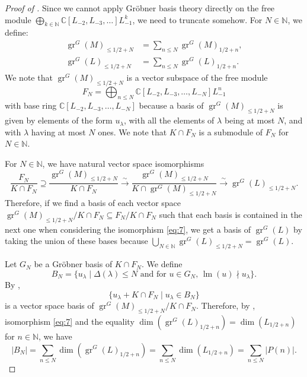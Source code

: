 \documentclass[a4paper, 12pt, reqno]{amsart}
\theoremstyle{remark}
\DeclareMathOperator{\gr}{gr}
\DeclareMathOperator{\lm}{lm}
\begin{document}
\begin{proof}[Proof of ]
  Since we cannot apply Gröbner basis theory directly on the free module $\bigoplus_{k \in \mathbb{N}}\mathbb{C}[L_{-2}, L_{-3}, \dots]L_{-1}^k$, we need to truncate somehow.
  For $N \in \mathbb{N}$, we define:
  \begin{align*}
    \gr^G(M)_{\le 1/2 + N} &= \sum_{n \le N}\gr^G(M)_{1/2 + n}, \\
    \gr^G(L)_{\le 1/2 + N} &= \sum_{n \le N}\gr^G(L)_{1/2 + n}.
  \end{align*}
  We note that $\gr^G(M)_{\le 1/2 + N}$ is a vector subspace of the free module
  \begin{equation*}
    F_N = \bigoplus_{n \le N}\mathbb{C}[L_{-2}, L_{-3}, \dots, L_{-N}]L_{-1}^n
  \end{equation*}
  with base ring $\mathbb{C}[L_{-2}, L_{-3}, \dots, L_{-N}]$ because a basis of $\gr^G(M)_{\le 1/2 + N}$ is given by elements of the form $u_{\lambda}$, with all the elements of $\lambda$ being at most $N$, and with $\lambda$ having at most $N$ ones.
  We note that $K \cap F_N$ is a submodule of $F_N$ for $N \in \mathbb{N}$.

  For $N \in \mathbb{N}$, we have natural vector space isomorphisms
  \begin{equation}
    \label{eq:7}
    \frac{F_N}{K \cap F_N} \supseteq \frac{\gr^G(M)_{\le 1/2 + N}}{K \cap F_N} \xrightarrow{\sim} \frac{\gr^G(M)_{\le 1/2 + N}}{K \cap \gr^G(M)_{\le 1/2 + N}} \xrightarrow{\sim} \gr^G(L)_{\le 1/2 + N}.
  \end{equation}
  Therefore, if we find a basis of each vector space $\gr^G(M)_{\le 1/2 + N}/K \cap F_N \subseteq F_N/K \cap F_N$ such that each basis is contained in the next one when considering the isomorphism \eqref{eq:7}, we get a basis of $\gr^G(L)$ by taking the union of these bases because $\bigcup_{N \in \mathbb{N}}\gr^G(L)_{\le 1/2 + N} = \gr^G(L)$.

  Let $G_N$ be a Gröbner basis of $K \cap F_N$.
  We define
  \begin{equation*}
    B_N = \{u_{\lambda} \mid \text{$\Delta(\lambda) \le N$ and for $u \in G_N$, $\lm(u) \nmid u_{\lambda}$}\}.
  \end{equation*}
  By \cite[Proposition 3.6.4]{adams_introduction_1994},
  \begin{equation}
    \label{eq:8}
    \{u_{\lambda} + K \cap F_N \mid u_{\lambda} \in B_N\}
  \end{equation}
  is a vector space basis of $\gr^G(M)_{\le 1/2 + N}/K \cap F_N$.
  Therefore, by , isomorphism \eqref{eq:7} and the equality $\dim(\gr^G(L)_{1/2 + n}) = \dim(L_{1/2 + n})$ for $n \in \mathbb{N}$, we have
  \begin{equation*}
    |B_N| = \sum_{n \le N}\dim(\gr^G(L)_{1/2 + n}) = \sum_{n \le N}\dim(L_{1/2 + n}) = \sum_{n \le N}|P(n)|.
  \end{equation*}


\end{proof}
\end{document}
